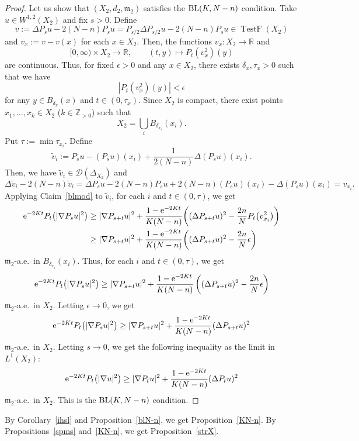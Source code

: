 \documentclass[pdftex]{sigma}
\numberwithin{equation}{section}
\theoremstyle{definition}
\newcommand{\TestF}{\operatorname{TestF}}
\newcommand{\R}{\mathbb{R}}
\newcommand{\Z}{\mathbb{Z}}
\newcommand{\mf}{\mathfrak{m}}
\newcommand{\BL}{{\rm BL}}
\newcommand{\D}{\mathcal{D}}
\begin{document}
\begin{proof}
Let us show that $(X_2,d_2,\mf_2)$ satisfies the $\BL(K,N-n)$ condition.
Take $u\in W^{1,2}(X_2)$ and fix $s>0$.
Define
\[
v:=\Delta P_s u-2(N-n)P_s u=P_{s/2}\Delta P_{s/2}u-2(N-n)P_s u\in \TestF(X_2)
\]
and $v_x:= v-v(x)$ for each $x\in X_2$.
Then, the functions $v_x\colon X_2\to \R$ and
\[
[0,\infty)\times X_2\to \R,\qquad
(t,y)\mapsto P_t(v_x^2)(y)
\]
are continuous.
Thus, for fixed $\epsilon>0$ and any $x\in X_2$, there exists $\delta_x,\tau_x>0$ such that
we have
\[
|P_t(v_x^2)(y)|<\epsilon
\]
for any $y\in B_{\delta_x}(x)$ and $t\in (0,\tau_x)$.
Since $X_2$ is compact, there exist points $x_1,\ldots, x_k\in X_2$ ($k\in \Z_{>0}$) such that
\[
X_2=\bigcup_{i}B_{\delta_{x_i}} (x_i).
\]
Put $\tau:=\min{\tau_{x_i}}$.
Define
\[
\tilde{v}_i:= P_s u-(P_s u)(x_i)+\frac{1}{2(N-n)}\Delta( P_s u)(x_i).
\]
Then, we have $\tilde{v}_i\in \D(\Delta_{X_2})$ and
\[
\Delta \tilde{v}_i-2(N-n)\tilde{v}_i=\Delta P_s u-2(N-n)P_s u+2(N-n)(P_s u)(x_i)-\Delta (P_s u)(x_i)=v_{x_i}.
\]
Applying Claim~\ref{blmod} to $\tilde{v}_i$, for each $i$ and $t\in (0,\tau)$, we get
\begin{align*}
{\rm e}^{-2K t}P_t\big(|\nabla P_s u|^2\big)&\geq |\nabla P_{s+t} u|^2+\frac{1-{\rm e}^{-2Kt}}{K(N-n)}\bigg( (\Delta P_{s+t} u)^2-\frac{2n}{N}P_t\big(v_{x_i}^2\big) \bigg)\\
&\geq |\nabla P_{s+t} u|^2+\frac{1-{\rm e}^{-2Kt}}{K(N-n)}\bigg( (\Delta P_{s+t} u)^2-\frac{2n}{N}\epsilon\bigg)
\end{align*}
$\mf_2$-a.e.\ in $B_{\delta_{x_i}}(x_i)$.
Thus, for each $i$ and $t\in (0,\tau)$, we get
\[
{\rm e}^{-2K t}P_t\big(|\nabla P_s u|^2\big)\geq|\nabla P_{s+t} u|^2+\frac{1-{\rm e}^{-2Kt}}{K(N-n)}\left((\Delta P_{s+t} u)^2-\frac{2n}{N}\epsilon\right)
\]
$\mf_2$-a.e.\ in $X_2$. Letting $\epsilon\to 0$, we get
\[
{\rm e}^{-2K t}P_t\big(|\nabla P_s u|^2\big)\geq|\nabla P_{s+t} u|^2+\frac{1-{\rm e}^{-2Kt}}{K(N-n)}(\Delta P_{s+t} u)^2
\]
$\mf_2$-a.e.\ in $X_2$.
Letting $s\to 0$, we get the following inequality as the limit in $L^1(X_2)$:
\[
{\rm e}^{-2K t}P_t\big(|\nabla u|^2\big)\geq|\nabla P_{t} u|^2+\frac{1-{\rm e}^{-2Kt}}{K(N-n)}(\Delta P_{t} u)^2
\]
$\mf_2$-a.e.\ in $X_2$. This is the $\BL(K,N-n)$ condition.
\end{proof}

By Corollary~\ref{ihsl} and Proposition~\ref{blN-n}, we get Proposition~\ref{KN-n}.
By Propositions~\ref{spms} and~\ref{KN-n}, we get Proposition~\ref{strX}.
\end{document}
